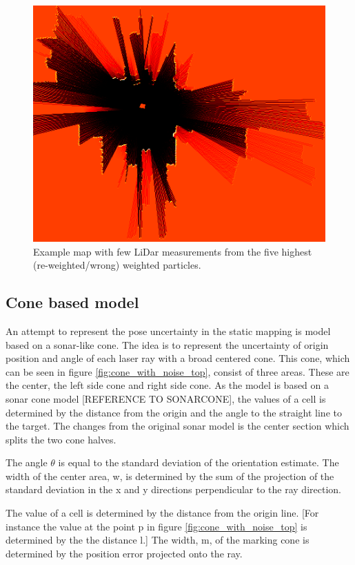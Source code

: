 \begin{figure}
	\centering
	\includegraphics[width=0.7\linewidth]{figures/static_mapping/particle_sensor}
	\caption{Example map with few LiDar measurements from the five highest (re-weighted/wrong) weighted particles.}
	\label{fig:particle_sensor}
\end{figure}

\subsection{Cone based model}
An attempt to represent the pose uncertainty in the static mapping is model based on a sonar-like cone. The idea is to represent the uncertainty of origin position and angle of each laser ray with a broad centered cone. 
This cone, which can be seen in figure  \ref{fig:cone_with_noise_top}, consist of three areas. These are the center, the left side cone and right side cone. As the model is based on a sonar cone model [REFERENCE TO SONARCONE], the values of a cell is determined by the distance from the origin and the angle to the straight line to the target. The changes from the original sonar model is the center section which splits the two cone halves. 

The angle \(\theta\) is equal to the standard deviation of the orientation estimate. 
The width of the center area, w, is determined by the sum of the projection of the standard deviation in the x and y directions perpendicular to the ray direction. 

The value of a cell is determined by the distance from the origin line. 
[For instance the value at the point p in figure \ref{fig:cone_with_noise_top} is determined by the the distance l.] 
The width, m, of the marking cone is determined by the position error projected onto the ray.

